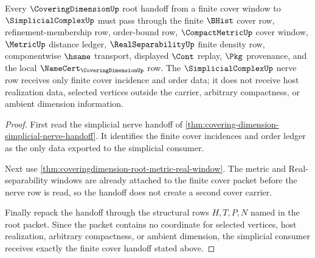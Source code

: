 \begin{theorem}
\label{thm:coveringdimension-root-simplicial-cover-handoff}
Every $\CoveringDimensionUp$ root handoff from a finite cover window to $\SimplicialComplexUp$ must pass through the finite $\BHist$ cover row, refinement-membership row, order-bound row, $\CompactMetricUp$ cover window, $\MetricUp$ distance ledger, $\RealSeparabilityUp$ finite density row, componentwise $\hsame$ transport, displayed $\Cont$ replay, $\Pkg$ provenance, and the local $\NameCert_{\CoveringDimensionUp}$ row. The $\SimplicialComplexUp$ nerve row receives only finite cover incidence and order data; it does not receive host realization data, selected vertices outside the carrier, arbitrary compactness, or ambient dimension information.
\end{theorem}
\begin{proof}
First read the simplicial nerve handoff of \autoref{thm:covering-dimension-simplicial-nerve-handoff}. It identifies the finite cover incidences and order ledger as the only data exported to the simplicial consumer.

Next use \autoref{thm:coveringdimension-root-metric-real-window}. The metric and Real-separability windows are already attached to the finite cover packet before the nerve row is read, so the handoff does not create a second cover carrier.

Finally repack the handoff through the structural rows $H,T,P,N$ named in the root packet. Since the packet contains no coordinate for selected vertices, host realization, arbitrary compactness, or ambient dimension, the simplicial consumer receives exactly the finite cover handoff stated above.
\end{proof}

